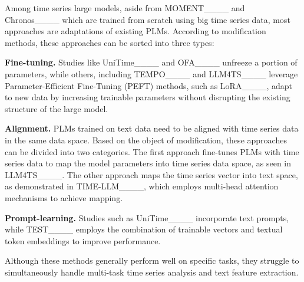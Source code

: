 Among time series large models, aside from MOMENT____ and Chronos____ which are trained from scratch using big time series data, most approaches are adaptations of existing PLMs. According to modification methods, these approaches can be sorted into three types:

\textbf{Fine-tuning.} Studies like UniTime____ and OFA____ unfreeze a portion of parameters, while others, including TEMPO____ and LLM4TS____ leverage Parameter-Efficient Fine-Tuning (PEFT) methods, such as LoRA____, adapt to new data by increasing trainable parameters without disrupting the existing structure of the large model. 


\textbf{Alignment.} PLMs trained on text data need to be aligned with time series data in the same data space. Based on the object of modification, these approaches can be divided into two categories. The first approach fine-tunes PLMs with time series data to map the model parameters into time series data space, as seen in LLM4TS____. The other approach maps the time series vector into text space, as demonstrated in TIME-LLM____, which employs multi-head attention mechanisms to achieve mapping.

\textbf{Prompt-learning.} Studies such as UniTime____ incorporate text prompts, while TEST____ employs the combination of trainable vectors and textual token embeddings to improve performance.



Although these methods generally perform well on specific tasks, they struggle to simultaneously handle multi-task time series analysis and text feature extraction.